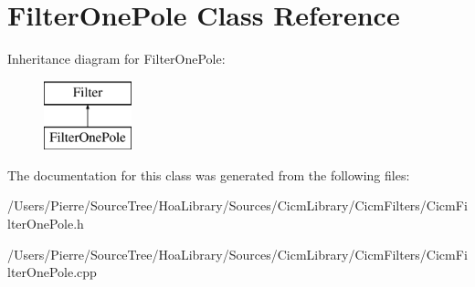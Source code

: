 \hypertarget{class_filter_one_pole}{\section{Filter\-One\-Pole Class Reference}
\label{class_filter_one_pole}
}
Inheritance diagram for Filter\-One\-Pole\-:\begin{figure}[H]
\begin{center}
\leavevmode
\includegraphics[height=2.000000cm]{class_filter_one_pole}
\end{center}
\end{figure}


The documentation for this class was generated from the following files\-:\begin{DoxyCompactItemize}
\item 
/\-Users/\-Pierre/\-Source\-Tree/\-Hoa\-Library/\-Sources/\-Cicm\-Library/\-Cicm\-Filters/Cicm\-Filter\-One\-Pole.\-h\item 
/\-Users/\-Pierre/\-Source\-Tree/\-Hoa\-Library/\-Sources/\-Cicm\-Library/\-Cicm\-Filters/Cicm\-Filter\-One\-Pole.\-cpp\end{DoxyCompactItemize}
